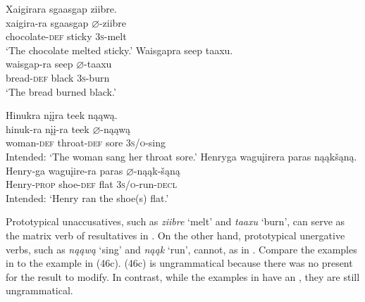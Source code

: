 \documentclass[output=paper]{LSP/langsci}
\begin{document}
\begin{exe}
\ex\label{ex:jrs:48}
\begin{xlist}
\ex     
\glll Xaigirara			sgaasgap		ziibre.\\
xaigira-ra			sgaasgap		$\varnothing$-ziibre \\
	chocolate-\textsc{def}	sticky			\textsc{3s}-melt \\
\trans `The chocolate melted sticky.'
\ex  
\glll Waisgapra		seep		taaxu.\\
waisgap-ra		seep		$\varnothing$-taaxu \\
	bread-\textsc{def}		black		\textsc{3s}-burn \\
\trans `The bread burned black.'
\end{xlist}
\end{exe}
\begin{exe}
\ex\label{ex:jrs:49}
\begin{xlist}
\ex   
\glll *Hinukra			n\k{i}\k{i}ra				teek	nąąwą.\\
hinuk-ra			n\k{i}\k{i}-ra				teek	$\varnothing$-nąąwą \\
		woman-\textsc{def}	 throat-\textsc{def}	sore	\textsc{3s/o}-sing \\
\trans Intended: `The woman sang her throat sore.'
\ex\label{ex:jrs:} 
\glll *Henryga			wagu\k{i}irera		paras		nąąk\v{s}ąną.\\
Henry-ga		wagu\k{i}ire-ra	paras		$\varnothing$-nąąk-\v{s}ąną \\
		Henry-\textsc{prop}	shoe-\textsc{def}			flat			\textsc{3s/o}-run-\textsc{decl} \\
\trans Intended: `Henry ran the shoe(s) flat.'
\end{xlist}
\end{exe}

Prototypical unaccusatives, such as \textit{ziibre} `melt' and \textit{taaxu} `burn', can serve as the matrix verb of resultatives in . On the other hand, prototypical unergative verbs, such as \textit{nąąwą} `sing' and \textit{nąąk} `run', cannot, as in . Compare the  examples in  to the  example in (46c). (46c) is ungrammatical because there was no  present for the result  to modify. In contrast, while the  examples in  have an , they are still ungrammatical.
	
\end{document}
